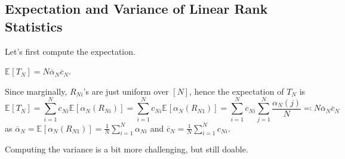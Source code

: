 \subsection{Expectation and Variance of Linear Rank Statistics}
Let's first compute the expectation.

\begin{claim}
	\(\mathbb{E}_{}[T_N] = N \overline{\alpha} _N \overline{c} _N\).
\end{claim}
\begin{explanation}
	Since marginally, \(R_{Ni}\)'s are just uniform over \([N]\), hence the expectation of \(T_N\) is
	\[
		\mathbb{E}_{}[T_N]
		= \sum_{i=1}^{N} c_{Ni} \mathbb{E}_{}[\alpha _N(R_{Ni})]
		= \sum_{i=1}^{N} c_{Ni} \mathbb{E}_{}[\alpha _N(R_{N1})]
		= \sum_{i=1}^{N} c_{Ni} \sum_{j=1}^{N} \frac{\alpha _N(j)}{N}
		\eqqcolon N \overline{\alpha} _N \overline{c} _N
	\]
	as \(\overline{\alpha} _N = \mathbb{E}_{}[\alpha _N(R_{N1})] = \frac{1}{N} \sum_{i=1}^{N} \alpha _{Ni}\) and \(\overline{c} _N = \frac{1}{N} \sum_{i=1}^{N} c_{Ni}\).
\end{explanation}

Computing the variance is a bit more challenging, but still doable.

